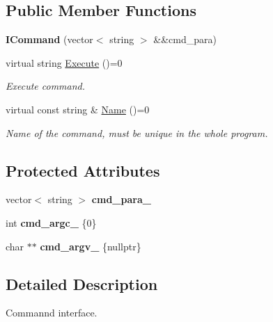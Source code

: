 \subsection*{Public Member Functions}
\begin{DoxyCompactItemize}
\item 
\mbox{\label{classwscmd_1_1ICommand_ab4768937ccb18cc24d8da7ad91da442a}} 
{\bfseries I\+Command} (vector$<$ string $>$ \&\&cmd\+\_\+para)
\item 
\mbox{\label{classwscmd_1_1ICommand_a9f4adb20beb9c577e1da6a8ef9a4ca43}} 
virtual string \hyperlink{classwscmd_1_1ICommand_a9f4adb20beb9c577e1da6a8ef9a4ca43}{Execute} ()=0
\begin{DoxyCompactList}\small\item\em Execute command. \end{DoxyCompactList}\item 
virtual const string \& \hyperlink{classwscmd_1_1ICommand_a1a9fdc32265fa902cb5f3ab153386a9e}{Name} ()=0
\begin{DoxyCompactList}\small\item\em Name of the command, must be unique in the whole program. \end{DoxyCompactList}\end{DoxyCompactItemize}
\subsection*{Protected Attributes}
\begin{DoxyCompactItemize}
\item 
\mbox{\label{classwscmd_1_1ICommand_ad8ebb0beab8997eebf9538d2bb9bb9dd}} 
vector$<$ string $>$ {\bfseries cmd\+\_\+para\+\_\+}
\item 
\mbox{\label{classwscmd_1_1ICommand_a82221aa31e2f2c1ab2b5fdaf082c4faa}} 
int {\bfseries cmd\+\_\+argc\+\_\+} \{0\}
\item 
\mbox{\label{classwscmd_1_1ICommand_ab18e734b8f8ff025caa26bd441580243}} 
char $\ast$$\ast$ {\bfseries cmd\+\_\+argv\+\_\+} \{nullptr\}
\end{DoxyCompactItemize}


\subsection{Detailed Description}
Commannd interface. 

